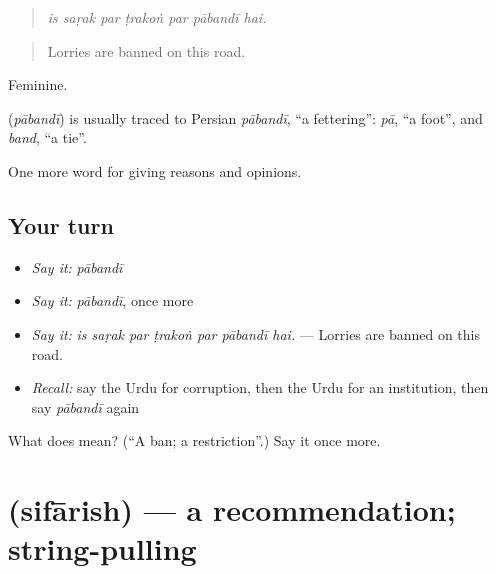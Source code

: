 \begin{quote}
      
\end{quote}

\begin{quote}
\emph{is saṛak par ṭrakoṅ par pābandī hai.}
\end{quote}

\begin{quote}
Lorries are banned on this road.
\end{quote}

Feminine.

\begin{cousinweb}
\textbf{} (\emph{pābandī}) is usually traced to Persian \emph{pābandī}, \textquotedblleft{}a fettering\textquotedblright{}: \emph{pā}, \textquotedblleft{}a foot\textquotedblright{}, and \emph{band}, \textquotedblleft{}a tie\textquotedblright{}.
\end{cousinweb}

\begin{grammarlens}[title={What you've built}]
One more word for giving reasons and opinions.
\end{grammarlens}

\subsection*{Your turn}
\begin{itemize}
\raggedright
  \item \emph{Say it:} \emph{pābandī}
  \item \emph{Say it:} \emph{pābandī}, once more
  \item \emph{Say it:} \emph{is saṛak par ṭrakoṅ par pābandī hai.} — Lorries are banned on this road.
  \item \emph{Recall:} say the Urdu for corruption, then the Urdu for an institution, then say \emph{pābandī} again
\end{itemize}

\begin{tcolorbox}[breakable,colback=teal!4,colframe=teal!35!black,title={Before you move on}]
What does  mean? (\textquotedblleft{}A ban; a restriction\textquotedblright{}.) Say it once more.
\end{tcolorbox}
\section[\texorpdfstring{\ur{سفارش} (sifārish)}{سفارش (sifārish)}]{ (sifārish) — a recommendation; string-pulling}

